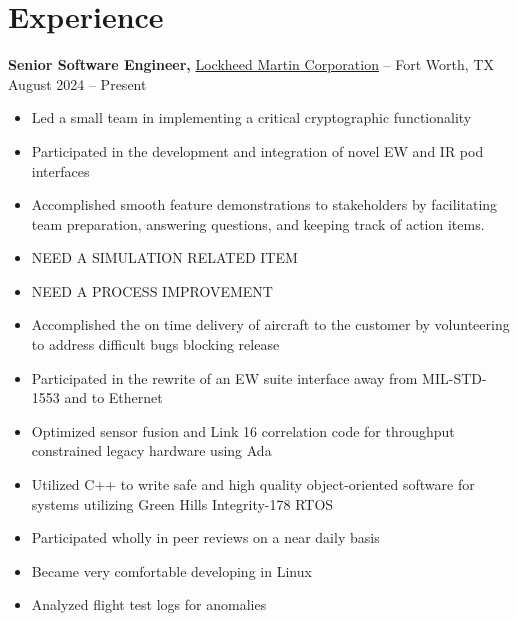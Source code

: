 \documentclass[11pt]{article}       %
\begin{document}
\section*{Experience}
\textbf{Senior Software Engineer,} \href{https://www.lockheedmartin.com/}{Lockheed Martin Corporation} -- Fort Worth, TX \hfill August 2024 -- Present \\
\vspace{-9pt}
\begin{itemize}
  \item Led a small team in implementing a critical cryptographic functionality
  \item Participated in the development and integration of novel EW and IR pod interfaces
  \item Accomplished smooth feature demonstrations to stakeholders by facilitating team preparation, answering questions, and keeping track of action items.
  \item NEED A SIMULATION RELATED ITEM
  \item NEED A PROCESS IMPROVEMENT
  \item Accomplished the on time delivery of aircraft to the customer by volunteering to address difficult bugs blocking release
  \item Participated in the rewrite of an EW suite interface away from MIL-STD-1553 and to Ethernet
  \item Optimized sensor fusion and Link 16 correlation code for throughput constrained legacy hardware using Ada
  \item Utilized C++ to write safe and high quality object-oriented software for systems utilizing Green Hills Integrity-178 RTOS
  \item Participated wholly in peer reviews on a near daily basis
  \item Became very comfortable developing in Linux
  \item Analyzed flight test logs for anomalies
\end{itemize}
\end{document}
